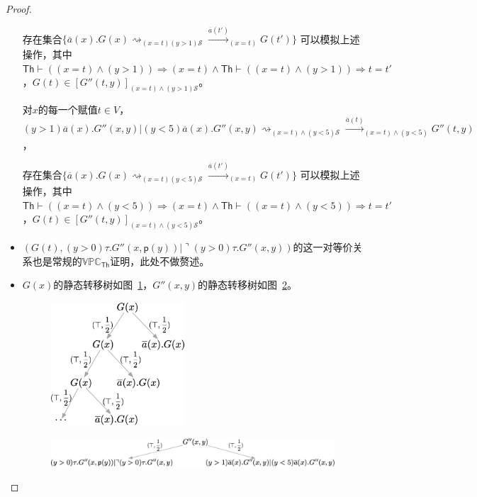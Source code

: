 \begin{proof}
\begin{itemize}
{\begin{itemize}
{               存在集合$\{\overline{a}(x).G(x)\rightsquigarrow_{(x=t)(y>1)\mathcal{S}}\stackrel{\overline{a}(t')}{\longrightarrow}_{(x=t)}G(t')\}$
               可以模拟上述操作，其中$\mathsf{Th}\vdash ((x=t)\wedge (y>1))\Rightarrow (x=t) \wedge \mathsf{Th}\vdash ((x=t)\wedge (y>1))\Rightarrow t=t'$，$G(t)\in [G''(t,y)]_{(x=t)\wedge (y>1)\mathcal{S}}$。
               
               对$x$的每一个赋值$t\in V$，
               $$(y>1)\overline{a}(x).G''(x,y)|(y<5)\overline{a}(x).G''(x,y)\rightsquigarrow_{(x=t)\wedge(y<5)\mathcal{S}}\stackrel{\overline{a}(t)}{\rightarrow}_{(x=t)\wedge(y<5)}G''(t,y)$$，
               
               存在集合$\{\overline{a}(x).G(x)\rightsquigarrow_{(x=t)(y<5)\mathcal{S}}\stackrel{\overline{a}(t')}{\longrightarrow}_{(x=t)}G(t')\}$
               可以模拟上述操作，其中$\mathsf{Th}\vdash ((x=t)\wedge (y<5))\Rightarrow (x=t) \wedge\mathsf{Th}\vdash ((x=t)\wedge (y<5))\Rightarrow t=t'$，$G(t)\in [G''(t,y)]_{(x=t)\wedge (y<5)\mathcal{S}}$。
            }
         \end{itemize}
      }
      \item {
         $(G(t),(y>0)\tau.G''(x,\mathsf{p}(y))|\urcorner (y>0)\tau.G''(x,y))$的这一对等价关系也是常规的$\mathbb{VPC}_{\mathsf{Th}}$证明，此处不做赘述。
      }
      \item {
         $G(x)$的静态转移树如图~\ref{fig_eg4_1}，$G''(x,y)$的静态转移树如图~\ref{fig_eg4_2}。
         \begin{figure}[!htbp]
            \caption[]{}
            \small
            \centering
            \includegraphics[width=5cm]{../figure/example1.png}
             \label{fig_eg4_1}
         \end{figure}
         \begin{figure}[!htbp]
            \caption[]{}
            \small
            \centering
            \includegraphics[width=13cm]{../figure/example4_2.png}
             \label{fig_eg4_2}
         \end{figure}

}
\end{itemize}
\end{proof}
